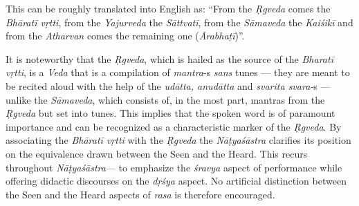 This can be roughly translated into English as: “From the \textsl{Ṛgveda} comes the \textsl{Bhāratī vṛtti}, from the \textsl{Yajurveda} the \textsl{Sāttvatī}, from the \textsl{Sāmaveda} the \textsl{Kaiśikī} and from the \textsl{Atharvan} comes the remaining one (\textsl{Ārabhaṭī})”. 

It is noteworthy that the \textsl{Ṛgveda}, which is hailed as the source of the \textsl{Bharatī vṛtti}, is a \textsl{Veda} that is a compilation of \textsl{mantra}-s \textsl{sans} tunes --- they are meant to be recited aloud with the help of the \textsl{udātta, anudātta} and \textsl{svarita svara-}s --- unlike the \textsl{Sāmaveda}, which consists of, in the most part, mantras from the \textsl{Ṛgveda} but set into tunes. This implies that the spoken word is of paramount importance and can be recognized as a characteristic marker of the \textsl{Ṛgveda}. By associating the \textsl{Bhāratī vṛtti} with the \textsl{Ṛgveda}  the \textsl{Nāṭyaśāstra} clarifies its position on the equivalence drawn between the Seen and the Heard. This recurs throughout \textsl{Nāṭyaśāstra}--- to emphasize the \textsl{śravya} aspect of performance while offering didactic discourses on the \textsl{dṛśya} aspect. No artificial distinction between the Seen and the Heard aspects of \textsl{rasa} is therefore encouraged.

